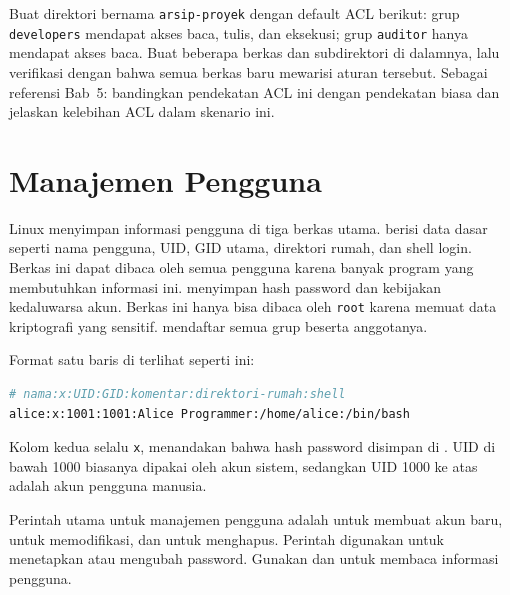 \begin{challengebox}
Buat direktori bernama \texttt{arsip-proyek} dengan default ACL berikut: grup \texttt{developers} mendapat akses baca, tulis, dan eksekusi; grup \texttt{auditor} hanya mendapat akses baca. Buat beberapa berkas dan subdirektori di dalamnya, lalu verifikasi dengan  bahwa semua berkas baru mewarisi aturan tersebut. Sebagai referensi Bab~5: bandingkan pendekatan ACL ini dengan pendekatan  biasa dan jelaskan kelebihan ACL dalam skenario ini.
\end{challengebox}

\section{Manajemen Pengguna}
\label{sec:user-management}

Linux menyimpan informasi pengguna di tiga berkas utama.  berisi data dasar seperti nama pengguna, UID, GID utama, direktori rumah, dan shell login. Berkas ini dapat dibaca oleh semua pengguna karena banyak program yang membutuhkan informasi ini.  menyimpan hash password dan kebijakan kedaluwarsa akun. Berkas ini hanya bisa dibaca oleh \texttt{root} karena memuat data kriptografi yang sensitif.  mendaftar semua grup beserta anggotanya.

Format satu baris di  terlihat seperti ini:

\begin{lstlisting}[language=bash, caption={Format berkas /etc/passwd}]
# nama:x:UID:GID:komentar:direktori-rumah:shell
alice:x:1001:1001:Alice Programmer:/home/alice:/bin/bash
\end{lstlisting}

Kolom kedua selalu \texttt{x}, menandakan bahwa hash password disimpan di . UID di bawah 1000 biasanya dipakai oleh akun sistem, sedangkan UID 1000 ke atas adalah akun pengguna manusia.

Perintah utama untuk manajemen pengguna adalah  untuk membuat akun baru,  untuk memodifikasi, dan  untuk menghapus. Perintah  digunakan untuk menetapkan atau mengubah password. Gunakan  dan  untuk membaca informasi pengguna.

